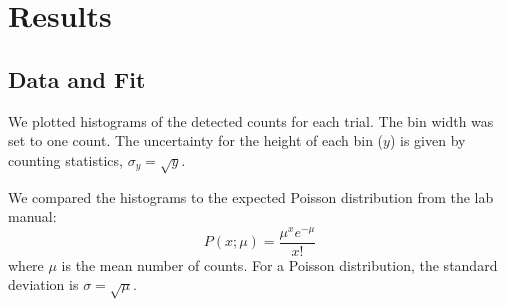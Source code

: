 \documentclass[letterpaper,12pt]{article}
\begin{document}









\section{Results}

\subsection{Data and Fit}
We plotted histograms of the detected counts for each trial. The bin width was set to one count. The uncertainty for the height of each bin ($y$) is given by counting statistics, $\sigma_y = \sqrt{y}$. 

We compared the histograms to the expected Poisson distribution from the lab manual:
\begin{equation}
    P(x; \mu) = \frac{\mu^x e^{-\mu}}{x!}
\end{equation}
where $\mu$ is the mean number of counts. For a Poisson distribution, the standard deviation is $\sigma = \sqrt{\mu}$. 
\end{document}

